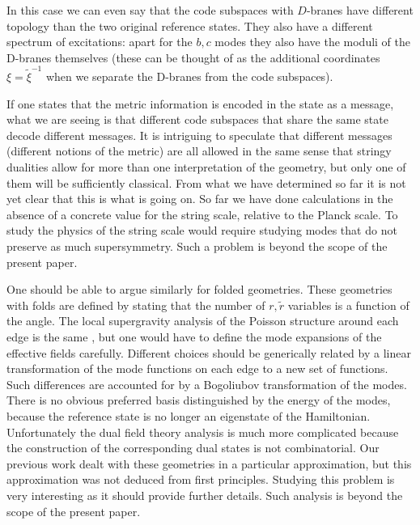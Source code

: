 \documentclass[12pt,nofootinbib, longbibliography]{revtex4-1}
\begin{document}
 


In this case we can even say that the code subspaces with $D$-branes have different topology than the two original reference states. They also have a different spectrum of excitations: apart for the $b,c$ modes they also have the moduli of the D-branes themselves (these can be thought of as the additional coordinates $\xi= \tilde \xi^{-1}$ when we separate the D-branes from the code subspaces).


If one states that the metric information is encoded in the state as a message, what we are seeing is that different code subspaces that share the same state decode different messages. It is intriguing to speculate that different messages (different notions of the metric) are all allowed in the same sense that stringy dualities allow for more than one interpretation of the geometry, but only one of them will be sufficiently classical.  From what we have determined so far it is not yet clear that this is what is going on. So far we have done calculations in the absence of a concrete value for the string scale, relative to the Planck scale. To study the physics of the string scale would require studying modes that do not preserve as much supersymmetry. Such a problem is beyond the scope of the present paper.

One should be able to argue similarly for folded geometries.  These  geometries with folds are defined by stating that the number of $r,\tilde r $ variables is a function of the angle. The local supergravity analysis of the Poisson structure around each edge is the same \cite{Maoz:2005nk}, but one would have to define the mode expansions of the effective fields carefully. Different choices should be generically related by a linear transformation of the mode functions on each edge to a new set of functions. Such differences are accounted for by a Bogoliubov transformation
of the modes. There is no obvious preferred basis distinguished by the energy of the modes, because the reference state is no longer an eigenstate of the Hamiltonian. 
Unfortunately the dual field theory analysis is much more complicated because the construction of the corresponding dual states is not combinatorial. Our previous work  \cite{Berenstein:2016pcx, Berenstein:2017abm} dealt with these geometries in a particular approximation, but this approximation was not deduced from first principles. 
Studying this problem is very interesting as it should provide further details. Such analysis is beyond the scope of the present paper.
\end{document}
